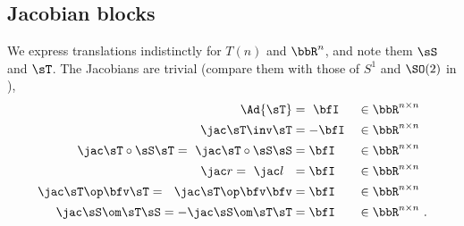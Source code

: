 \subsection{Jacobian blocks}

We express translations indistinctly for $T(n)$ and $\bbR^n$, and note them $\sS$ and $\sT$.
The Jacobians are trivial (compare them with those of $S^1$ and $\SO(2)$ in ),
%
\begin{align}
\Ad{\sT}       
 &= ~\bfI 
 &&\in\bbR^{n\times n} \\
\mjac{\sT\inv}{\sT} 
 &= -\bfI 
 &&\in\bbR^{n\times n} \\
\mjac{\sT\circ\sS}{\sT} = ~\mjac{\sT\circ\sS}{\sS} 
 &= \bfI 
 &&\in\bbR^{n\times n} \\
\mjac{}{r} = ~\mjac{}{l} ~~
 &= \bfI 
 &&\in\bbR^{n\times n} \\
\mjac{\sT\op\bfv}{\sT} = ~~\mjac{\sT\op\bfv}{\bfv} 
 &= \bfI 
 &&\in\bbR^{n\times n} \\
\mjac{\sS\om\sT}{\sS} = -\mjac{\sS\om\sT}{\sT} 
 &= \bfI 
 &&\in\bbR^{n\times n} 
~.
\end{align}
